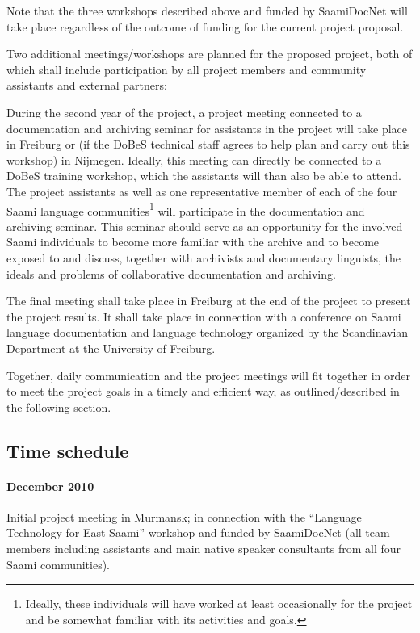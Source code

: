 \documentclass[a4paper,12pt]{article}
\begin{document}
{{{{%

Note that the three workshops described above and funded by SaamiDocNet will take place regardless of the outcome of funding for the current project proposal.

Two additional meetings/workshops are planned for the proposed project, both of which shall include participation by all project members and community assistants and external partners:%

During the second year of the project, a project meeting connected to a documentation and archiving seminar for assistants in the project will take place in Freiburg or (if the DoBeS technical staff agrees to help plan and carry out this workshop) in Nijmegen. Ideally, this meeting can directly be connected to a DoBeS training workshop, which the assistants will than also be able to attend. The project assistants as well as one representative member of each of the four Saami language communities\footnote{Ideally, these individuals will have worked at least occasionally for the project and be somewhat familiar with its activities and goals.} will participate in the documentation and archiving seminar. This seminar should serve as an opportunity for the involved Saami individuals to become more familiar with the archive and to become exposed to and discuss, together with archivists and documentary linguists, the ideals and problems of collaborative documentation and archiving.%

The final meeting shall take place in Freiburg at the end of the project to present the project results. It shall take place in connection with a conference on Saami language documentation and language technology organized by the Scandinavian Department at the University of Freiburg.

Together, daily communication and the project meetings will fit together in order to meet the project goals in a timely and efficient way, as outlined/described in the following section.

\subsection{Time schedule}

\paragraph{December 2010}Initial project meeting in Murmansk; in connection with the “Language Technology for East Saami” workshop and funded by SaamiDocNet (all team members including assistants and main native speaker consultants from all four Saami communities).

}}}}
\end{document}
